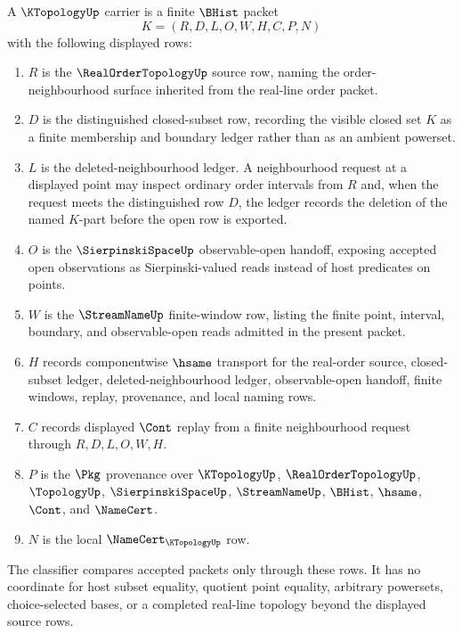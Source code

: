 \begin{definition}
\label{def:k-topology-carrier}
A $\KTopologyUp$ carrier is a finite $\BHist$ packet
$$
K=(R,D,L,O,W,H,C,P,N)
$$
with the following displayed rows:
\begin{enumerate}
\item $R$ is the $\RealOrderTopologyUp$ source row, naming the order-neighbourhood surface inherited from the real-line order packet.
\item $D$ is the distinguished closed-subset row, recording the visible closed set $K$ as a finite membership and boundary ledger rather than as an ambient powerset.
\item $L$ is the deleted-neighbourhood ledger. A neighbourhood request at a displayed point may inspect ordinary order intervals from $R$ and, when the request meets the distinguished row $D$, the ledger records the deletion of the named $K$-part before the open row is exported.
\item $O$ is the $\SierpinskiSpaceUp$ observable-open handoff, exposing accepted open observations as Sierpinski-valued reads instead of host predicates on points.
\item $W$ is the $\StreamNameUp$ finite-window row, listing the finite point, interval, boundary, and observable-open reads admitted in the present packet.
\item $H$ records componentwise $\hsame$ transport for the real-order source, closed-subset ledger, deleted-neighbourhood ledger, observable-open handoff, finite windows, replay, provenance, and local naming rows.
\item $C$ records displayed $\Cont$ replay from a finite neighbourhood request through $R,D,L,O,W,H$.
\item $P$ is the $\Pkg$ provenance over $\KTopologyUp$, $\RealOrderTopologyUp$, $\TopologyUp$, $\SierpinskiSpaceUp$, $\StreamNameUp$, $\BHist$, $\hsame$, $\Cont$, and $\NameCert$.
\item $N$ is the local $\NameCert_{\KTopologyUp}$ row.
\end{enumerate}
The classifier compares accepted packets only through these rows. It has no coordinate for host subset equality, quotient point equality, arbitrary powersets, choice-selected bases, or a completed real-line topology beyond the displayed source rows.
\end{definition}

